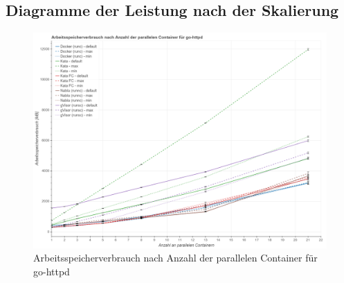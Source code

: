 \subsection{Diagramme der Leistung nach der Skalierung}

\begin{figure}[h]
	\centering
	\includegraphics[width=0.96\linewidth]{gfx/auswertung/ram_go.png}
	\caption{Arbeitsspeicherverbrauch nach Anzahl der parallelen Container für go-httpd} 
	\label{fig:ram_go}
\end{figure}
\newpage


